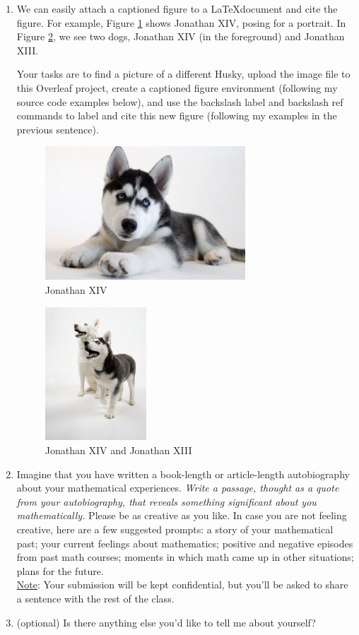 \documentclass[12pt]{amsart}
\begin{document}
\begin{enumerate}
\item 
We can easily attach a captioned figure to a \LaTeX document and cite the figure. For example, Figure \ref{fig:jonathan14} shows Jonathan XIV, posing for a portrait. In Figure \ref{fig:jonathan14_13}, we see two dogs, Jonathan XIV (in the foreground) and Jonathan XIII. 

Your tasks are to find a picture of a different Husky, upload the image file to this Overleaf project, create a captioned figure environment (following my source code examples below), and use the backslash label and backslash ref commands to label and cite this new figure (following my examples in the previous sentence). 

\begin{figure}
    \centering
    \includegraphics[height=5cm]{JonathanXIV.jpg}
    \caption{Jonathan XIV}
    \label{fig:jonathan14}
\end{figure}

\begin{figure}
    \centering
    \includegraphics[height=5cm]{JonathanXIV_XIII.jpg}
    \caption{Jonathan XIV and Jonathan XIII}
    \label{fig:jonathan14_13}
\end{figure}
 
 
 
\item 
Imagine that you have written a book-length or article-length autobiography about your mathematical experiences. \emph{Write a passage, thought as a quote from your autobiography, that reveals something significant about you mathematically.} Please be as creative as you like. In case you are not feeling creative, here are a few suggested prompts: a story of your mathematical past; your current feelings about mathematics; 
positive and negative episodes from past math courses; moments in which math came up in other situations; plans for the future.\\
\underline{Note}: Your submission will be kept confidential, but you'll be asked to share a sentence with the rest of the class.

\item 
(optional) Is there anything else you'd like to tell me about yourself?

\end{enumerate}
\end{document}
